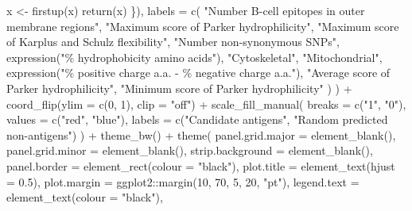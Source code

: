 \documentclass[
  11pt,
  oneside]{book}
\newenvironment{Shaded}{\begin{snugshade}}{\end{snugshade}}
\newcommand{\AttributeTok}[1]{\textcolor[rgb]{0.77,0.63,0.00}{#1}}
\newcommand{\DecValTok}[1]{\textcolor[rgb]{0.00,0.00,0.81}{#1}}
\newcommand{\FloatTok}[1]{\textcolor[rgb]{0.00,0.00,0.81}{#1}}
\newcommand{\FunctionTok}[1]{\textcolor[rgb]{0.00,0.00,0.00}{#1}}
\newcommand{\NormalTok}[1]{#1}
\newcommand{\OtherTok}[1]{\textcolor[rgb]{0.56,0.35,0.01}{#1}}
\newcommand{\SpecialCharTok}[1]{\textcolor[rgb]{0.00,0.00,0.00}{#1}}
\newcommand{\StringTok}[1]{\textcolor[rgb]{0.31,0.60,0.02}{#1}}
\begin{document}
\begin{Shaded}
\begin{Highlighting}[]
\NormalTok{      x }\OtherTok{\textless{}{-}} \FunctionTok{firstup}\NormalTok{(x)}
      \FunctionTok{return}\NormalTok{(x)}
\NormalTok{    \}),}
    \AttributeTok{labels =} \FunctionTok{c}\NormalTok{(}
      \StringTok{"Number B{-}cell epitopes in outer membrane regions"}\NormalTok{,}
      \StringTok{"Maximum score of Parker hydrophilicity"}\NormalTok{,}
      \StringTok{"Maximum score of Karplus and Schulz flexibility"}\NormalTok{,}
      \StringTok{"Number non{-}synonymous SNPs"}\NormalTok{,}
      \FunctionTok{expression}\NormalTok{(}\StringTok{"\% hydrophobicity amino acids"}\NormalTok{),}
      \StringTok{"Cytoskeletal"}\NormalTok{,}
      \StringTok{"Mitochondrial"}\NormalTok{,}
      \FunctionTok{expression}\NormalTok{(}\StringTok{"\% positive charge a.a. {-} \% negative charge a.a."}\NormalTok{),}
      \StringTok{"Average score of Parker hydrophilicity"}\NormalTok{,}
      \StringTok{"Minimum score of Parker hydrophilicity"}
\NormalTok{    )}
\NormalTok{  ) }\SpecialCharTok{+}
  \FunctionTok{coord\_flip}\NormalTok{(}\AttributeTok{ylim =} \FunctionTok{c}\NormalTok{(}\DecValTok{0}\NormalTok{, }\DecValTok{1}\NormalTok{), }\AttributeTok{clip =} \StringTok{"off"}\NormalTok{) }\SpecialCharTok{+}
  \FunctionTok{scale\_fill\_manual}\NormalTok{(}
    \AttributeTok{breaks =} \FunctionTok{c}\NormalTok{(}\StringTok{"1"}\NormalTok{, }\StringTok{"0"}\NormalTok{), }\AttributeTok{values =} \FunctionTok{c}\NormalTok{(}\StringTok{"red"}\NormalTok{, }\StringTok{"blue"}\NormalTok{),}
    \AttributeTok{labels =} \FunctionTok{c}\NormalTok{(}\StringTok{"Candidate antigens"}\NormalTok{, }\StringTok{"Random predicted non{-}antigens"}\NormalTok{)}
\NormalTok{  ) }\SpecialCharTok{+}
  \FunctionTok{theme\_bw}\NormalTok{() }\SpecialCharTok{+}
  \FunctionTok{theme}\NormalTok{(}
    \AttributeTok{panel.grid.major =} \FunctionTok{element\_blank}\NormalTok{(),}
    \AttributeTok{panel.grid.minor =} \FunctionTok{element\_blank}\NormalTok{(),}
    \AttributeTok{strip.background =} \FunctionTok{element\_blank}\NormalTok{(),}
    \AttributeTok{panel.border =} \FunctionTok{element\_rect}\NormalTok{(}\AttributeTok{colour =} \StringTok{"black"}\NormalTok{),}
    \AttributeTok{plot.title =} \FunctionTok{element\_text}\NormalTok{(}\AttributeTok{hjust =} \FloatTok{0.5}\NormalTok{),}
    \AttributeTok{plot.margin =}\NormalTok{ ggplot2}\SpecialCharTok{::}\FunctionTok{margin}\NormalTok{(}\DecValTok{10}\NormalTok{, }\DecValTok{70}\NormalTok{, }\DecValTok{5}\NormalTok{, }\DecValTok{20}\NormalTok{, }\StringTok{"pt"}\NormalTok{),}
    \AttributeTok{legend.text =} \FunctionTok{element\_text}\NormalTok{(}\AttributeTok{colour =} \StringTok{"black"}\NormalTok{),}

\end{Highlighting}
\end{Shaded}
\end{document}

